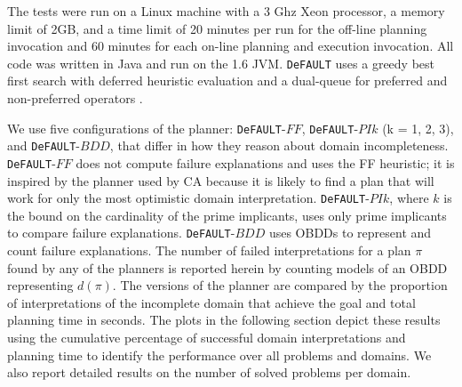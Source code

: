 \documentclass{article}
\def\citep#1{\cite{#1}}
\def\und#1{\noindent{\bf #1}:}
\def\FFRISKY{{\tt DeFAULT}}
\def\und#1{\medskip{\noindent\bf #1:}}
\begin{document}
\und{Test Setup} The tests were run on a Linux machine with a 3 Ghz Xeon processor, a memory limit of 2GB, and a time limit of 20 minutes per run for the off-line planning invocation and 60 minutes for each on-line planning and execution invocation.  All code was written in Java and run on the 1.6 JVM.  \FFRISKY{} uses a greedy best first search with deferred heuristic evaluation and a dual-queue for preferred and non-preferred operators \citep{DBLP:journals/jair/Helmert06}.  %



We use five configurations of the planner: \FFRISKY{}-$FF$, \FFRISKY{}-$PIk$ (k = 1, 2, 3), and \FFRISKY{}-$BDD$, that differ in how they reason about domain incompleteness.  \FFRISKY{}-$FF$ does not compute failure explanations and uses the FF heuristic;  it is inspired by the planner used by CA because it is likely to find a plan that will work for only the most optimistic domain interpretation.  \FFRISKY{}-$PIk$, where $k$ is the bound on the cardinality of the prime implicants, uses only prime implicants to compare failure explanations.  \FFRISKY{}-$BDD$ uses OBDDs to represent and count failure explanations.  The number of failed interpretations for a plan $\pi$ found by any of the planners is reported herein by counting models of an OBDD representing $d(\pi)$.
The versions of the planner are compared by the proportion of interpretations of the incomplete domain that achieve the goal and total planning time in seconds.  
The plots in the following section depict these results using the cumulative percentage of successful domain interpretations and planning time to identify the performance over all problems and domains.  We also report detailed results on the number of solved problems per domain. 
\end{document}
